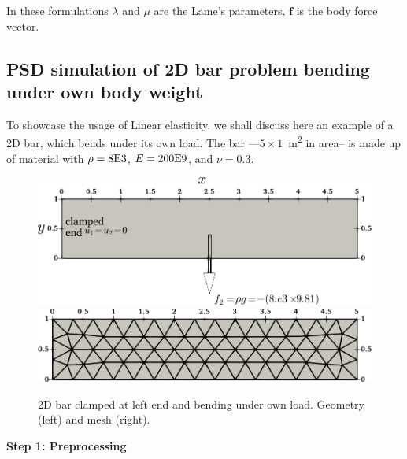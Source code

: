 \documentclass{report}
\begin{document}
In these formulations $\lambda$ and $\mu$ are the Lame's parameters, $\mathbf{f}$ is the body force vector.  

\subsection{PSD simulation of 2D bar problem bending under own body weight \label{sec:2d-bar-load}}

To showcase the usage of Linear elasticity, we shall discuss here an example of a 2D bar, which bends under its own load. The bar ---$5\times1$~\si{\square\meter} in area-- is made up of material with $\rho=8\text E3$, $E=200\text E9$, and $\nu=0.3$.

\begin{figure}[htbp]
    \centering
    \includegraphics[align=t,width=.44\textwidth]{2d-bar.png}\hspace{.1\textwidth}
    \includegraphics[align=t,width=.44\textwidth]{2d-bar-mesh.png}
    \caption{2D bar clamped at left end and bending under own load. Geometry (left) and mesh (right).}
    \label{fig:my_label}
\end{figure} 

\textbf{Step 1: Preprocessing}
\end{document}
